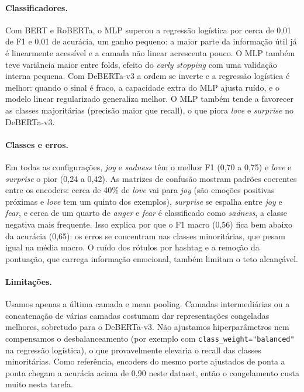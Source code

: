 \documentclass[11pt,a4paper]{article}
\begin{document}
\paragraph{Classificadores.} Com BERT e RoBERTa, o MLP superou a regressão logística por cerca de 0,01 de F1 e 0,01 de acurácia, um ganho pequeno: a maior parte da informação útil já é linearmente acessível e a camada não linear acrescenta pouco. O MLP também teve variância maior entre folds, efeito do \textit{early stopping} com uma validação interna pequena. Com DeBERTa-v3 a ordem se inverte e a regressão logística é melhor: quando o sinal é fraco, a capacidade extra do MLP ajusta ruído, e o modelo linear regularizado generaliza melhor. O MLP também tende a favorecer as classes majoritárias (precisão maior que recall), o que piora \textit{love} e \textit{surprise} no DeBERTa-v3.

\paragraph{Classes e erros.} Em todas as configurações, \textit{joy} e \textit{sadness} têm o melhor F1 (0,70 a 0,75) e \textit{love} e \textit{surprise} o pior (0,24 a 0,42). As matrizes de confusão mostram padrões coerentes entre os encoders: cerca de 40\% de \textit{love} vai para \textit{joy} (são emoções positivas próximas e \textit{love} tem um quinto dos exemplos), \textit{surprise} se espalha entre \textit{joy} e \textit{fear}, e cerca de um quarto de \textit{anger} e \textit{fear} é classificado como \textit{sadness}, a classe negativa mais frequente. Isso explica por que o F1 macro (0,56) fica bem abaixo da acurácia (0,65): os erros se concentram nas classes minoritárias, que pesam igual na média macro. O ruído dos rótulos por hashtag e a remoção da pontuação, que carrega informação emocional, também limitam o teto alcançável.

\paragraph{Limitações.} Usamos apenas a última camada e mean pooling. Camadas intermediárias ou a concatenação de várias camadas costumam dar representações congeladas melhores, sobretudo para o DeBERTa-v3. Não ajustamos hiperparâmetros nem compensamos o desbalanceamento (por exemplo com \texttt{class\_weight="balanced"} na regressão logística), o que provavelmente elevaria o recall das classes minoritárias. Como referência, encoders do mesmo porte ajustados de ponta a ponta chegam a acurácia acima de 0,90 neste dataset, então o congelamento custa muito nesta tarefa.
\end{document}
